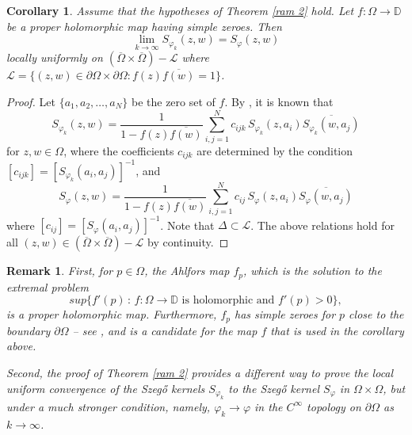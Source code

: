 \documentclass[11pt, reqno]{amsart}
\newtheorem{cor}[thm]{Corollary}
\newtheorem{rem}[thm]{Remark}
\numberwithin{equation}{section}
\begin{document}
\begin{cor}\label{ram2_cor}
Assume that the hypotheses of Theorem \ref{ram 2} hold. Let $f:\Omega\rightarrow\mathbb{D}$ be a proper holomorphic map having simple zeroes. Then
\[
\lim_{k\rightarrow\infty}S_{\varphi_k}(z,w) = S_{\varphi}(z,w)
\]
locally uniformly on $(\overline{\Omega}\times\overline{\Omega})- \mathcal{L}$ where $\mathcal{L}=\{(z,w)\in\partial\Omega\times\partial\Omega : f(z) \overline{f(w)}=1\}$. 
\end{cor}

\begin{proof}
Let $\{a_1,a_2,\ldots,a_N\}$ be the zero set of $f$. By \cite{Be1}, it is known that 
\begin{equation}
S_{\varphi_k}(z,w) = \frac{1}{1-f(z)\overline{f(w)}} \sum_{i,j=1}^N c_{ijk}\, S_{\varphi_k}(z,a_i) \overline{S_{\varphi_k}(w,a_j)} 
\end{equation}
for $z,w\in\Omega$, where the coefficients $c_{ijk}$ are determined by the condition $[c_{ijk}]=[S_{\varphi_k}(a_i,a_j)]^{-1}$, and
\[
S_{\varphi}(z,w) = \frac{1}{1-f(z)\overline{f(w)}} \sum_{i,j=1}^N c_{ij}\, S_{\varphi}(z,a_i) \overline{S_{\varphi}(w,a_j)} 
\]
where $[c_{ij}]=[S_{\varphi}(a_i,a_j)]^{-1}$. Note that $\Delta\subset\mathcal{L}$. The above relations hold for all $(z,w)\in (\overline{\Omega}\times\overline{\Omega})-\mathcal{L}$ by continuity. 
\end{proof}

\begin{rem}

First, for $p \in \Omega$, the Ahlfors map $f_p$, which is the solution to the extremal problem 
    \[
    sup\{f'(p) \, : \, f:\Omega\rightarrow\mathbb{D} \text{ is holomorphic and }f'(p)>0\},
    \]
    is a proper holomorphic map. Furthermore, $f_p$ has simple zeroes for $p$ close to the boundary $\partial\Omega$ -- see \cite{Be0}, and is a candidate for the map $f$ that is used in the corollary above.    

\medskip
    
    Second, the proof of Theorem \ref{ram 2} provides a different way to prove the local uniform convergence of the Szeg\H{o} kernels $S_{\varphi_k}$ to the Szeg\H{o} kernel $S_{\varphi}$ in $\Omega\times\Omega$, but under a much stronger condition, namely, $\varphi_k\rightarrow\varphi$ in the $C^{\infty}$ topology on $\partial\Omega$ as $k\rightarrow\infty$.

\end{rem}
\end{document}
